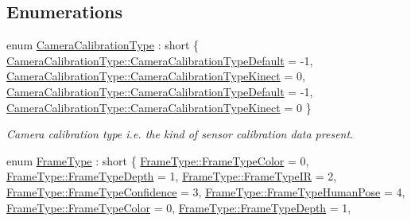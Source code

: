\subsection*{Enumerations}
\begin{DoxyCompactItemize}
\item 
enum \hyperlink{namespacemoetsi_1_1ssp_a1f51291db51233dc5865d42e6ee36ef8}{Camera\+Calibration\+Type} \+: short \{ \hyperlink{namespacemoetsi_1_1ssp_a1f51291db51233dc5865d42e6ee36ef8ac32f0bb1b309dd3992d8e37bfaa00c78}{Camera\+Calibration\+Type\+::\+Camera\+Calibration\+Type\+Default} = -\/1, 
\hyperlink{namespacemoetsi_1_1ssp_a1f51291db51233dc5865d42e6ee36ef8a662285f55328b6f7305456b86b8056bb}{Camera\+Calibration\+Type\+::\+Camera\+Calibration\+Type\+Kinect} = 0, 
\hyperlink{namespacemoetsi_1_1ssp_a1f51291db51233dc5865d42e6ee36ef8ac32f0bb1b309dd3992d8e37bfaa00c78}{Camera\+Calibration\+Type\+::\+Camera\+Calibration\+Type\+Default} = -\/1, 
\hyperlink{namespacemoetsi_1_1ssp_a1f51291db51233dc5865d42e6ee36ef8a662285f55328b6f7305456b86b8056bb}{Camera\+Calibration\+Type\+::\+Camera\+Calibration\+Type\+Kinect} = 0
 \}\begin{DoxyCompactList}\small\item\em Camera calibration type i.\+e. the kind of sensor calibration data present. \end{DoxyCompactList}
\item 
enum \hyperlink{namespacemoetsi_1_1ssp_a46efdfa2cd5a28ead465dcc8006b5a87}{Frame\+Type} \+: short \{ \newline
\hyperlink{namespacemoetsi_1_1ssp_a46efdfa2cd5a28ead465dcc8006b5a87ad039a5ecd3504edc955b88006db4ba21}{Frame\+Type\+::\+Frame\+Type\+Color} = 0, 
\hyperlink{namespacemoetsi_1_1ssp_a46efdfa2cd5a28ead465dcc8006b5a87a59cea6d94577d85ef8e142036e047064}{Frame\+Type\+::\+Frame\+Type\+Depth} = 1, 
\hyperlink{namespacemoetsi_1_1ssp_a46efdfa2cd5a28ead465dcc8006b5a87a2c799f7416882b538fa8295567f65cf5}{Frame\+Type\+::\+Frame\+Type\+IR} = 2, 
\hyperlink{namespacemoetsi_1_1ssp_a46efdfa2cd5a28ead465dcc8006b5a87a1b85b2c60b857778932e29e0e5021ba1}{Frame\+Type\+::\+Frame\+Type\+Confidence} = 3, 
\newline
\hyperlink{namespacemoetsi_1_1ssp_a46efdfa2cd5a28ead465dcc8006b5a87aa4b26dd8fd8d1f8a6ba0cc75f2302018}{Frame\+Type\+::\+Frame\+Type\+Human\+Pose} = 4, 
\hyperlink{namespacemoetsi_1_1ssp_a46efdfa2cd5a28ead465dcc8006b5a87ad039a5ecd3504edc955b88006db4ba21}{Frame\+Type\+::\+Frame\+Type\+Color} = 0, 
\hyperlink{namespacemoetsi_1_1ssp_a46efdfa2cd5a28ead465dcc8006b5a87a59cea6d94577d85ef8e142036e047064}{Frame\+Type\+::\+Frame\+Type\+Depth} = 1, 

\end{DoxyCompactItemize}
